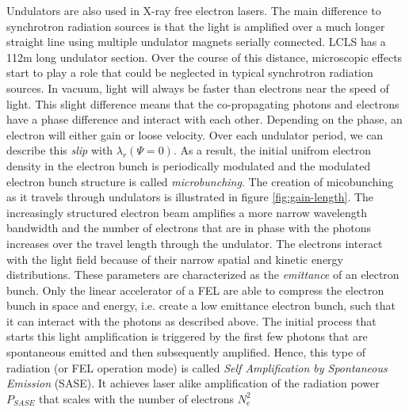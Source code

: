 Undulators are also used in X-ray free electron lasers. The main difference to synchrotron radiation sources is that the light is amplified over a much longer straight line using multiple undulator magnets serially connected. LCLS has a 112m long undulator section. Over the course of this distance, microscopic effects start to play a role that could be neglected in typical synchrotron radiation sources. In vacuum, light will always be faster than electrons near the speed of light. This slight difference means that the co-propagating photons and electrons have a phase difference and interact with each other. Depending on the phase, an electron will either gain or loose velocity. Over each undulator period, we can describe this \textit{slip} with $\lambda_{r}(\Psi = 0)$. As a result, the initial unifrom electron density in the electron bunch is periodically modulated and the modulated electron bunch structure is called \textit{microbunching}. The creation of micobunching as it travels through undulators is illustrated in figure \ref{fig:gain-length}. The increasingly structured electron beam amplifies a more narrow wavelength bandwidth and the number of electrons that are in phase with the photons increases over the travel length through the undulator. The electrons interact with the light field because of their narrow spatial and kinetic energy distributions. These parameters are characterized as the \textit{emittance} of an electron bunch. Only the linear accelerator of a FEL are able to compress the electron bunch in space and energy, i.e. create a low emittance electron bunch, such that it can interact with the photons as described above. The initial process that starts this light amplification is triggered by the first few photons that are spontaneous emitted and then subsequently amplified. Hence, this type of radiation (or FEL operation mode) is called \textit{Self Amplification by Spontaneous Emission} (SASE). It achieves laser alike amplification of the radiation power $P_{SASE}$ that scales with the number of electrons $N_{e}^{2}$ \citep[see][p.~61]{Als-Nielson-2011-JWS}
